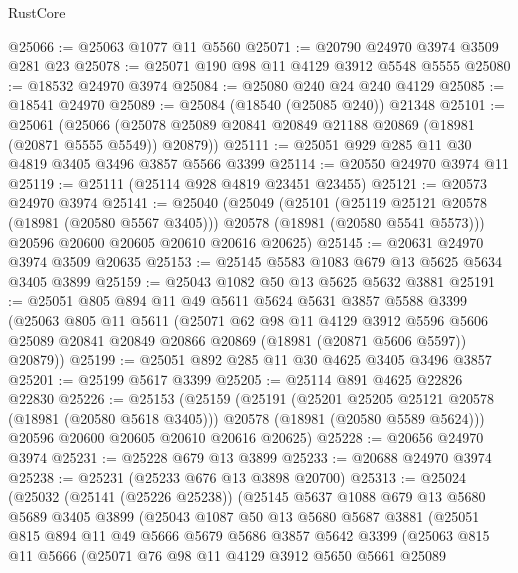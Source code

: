 \begin{lexlean}{RustCore}
\begin{coremodule}
@25066 := @25063 @1077 @11 @5560
@25071 := @20790 @24970 @3974 @3509 @281 @23
@25078 := @25071 @190 @98 @11 @4129 @3912 @5548 @5555
@25080 := @18532 @24970 @3974
@25084 := @25080 @240 @24 @240 @4129
@25085 := @18541 @24970
@25089 := @25084 (@18540 (@25085 @240)) @21348
@25101 := @25061
    (@25066 (@25078 @25089 @20841 @20849 @21188 @20869 (@18981 (@20871 @5555 @5549)) @20879))
@25111 := @25051 @929 @285 @11 @30 @4819 @3405 @3496 @3857 @5566 @3399
@25114 := @20550 @24970 @3974 @11
@25119 := @25111 (@25114 @928 @4819 @23451 @23455)
@25121 := @20573 @24970 @3974
@25141 := @25040
    (@25049
      (@25101
        (@25119 @25121 @20578 (@18981 (@20580 @5567 @3405)))
        @20578
        (@18981 (@20580 @5541 @5573)))
      @20596
      @20600
      @20605
      @20610
      @20616
      @20625)
@25145 := @20631 @24970 @3974 @3509 @20635
@25153 := @25145 @5583 @1083 @679 @13 @5625 @5634 @3405 @3899
@25159 := @25043 @1082 @50 @13 @5625 @5632 @3881
@25191 := @25051
    @805
    @894
    @11
    @49
    @5611
    @5624
    @5631
    @3857
    @5588
    @3399
    (@25063
      @805
      @11
      @5611
      (@25071
        @62
        @98
        @11
        @4129
        @3912
        @5596
        @5606
        @25089
        @20841
        @20849
        @20866
        @20869
        (@18981 (@20871 @5606 @5597))
        @20879))
@25199 := @25051 @892 @285 @11 @30 @4625 @3405 @3496 @3857
@25201 := @25199 @5617 @3399
@25205 := @25114 @891 @4625 @22826 @22830
@25226 := @25153
    (@25159
      (@25191
        (@25201 @25205 @25121 @20578 (@18981 (@20580 @5618 @3405)))
        @20578
        (@18981 (@20580 @5589 @5624)))
      @20596
      @20600
      @20605
      @20610
      @20616
      @20625)
@25228 := @20656 @24970 @3974
@25231 := @25228 @679 @13 @3899
@25233 := @20688 @24970 @3974
@25238 := @25231 (@25233 @676 @13 @3898 @20700)
@25313 := @25024
    (@25032
      (@25141 (@25226 @25238))
      (@25145
        @5637
        @1088
        @679
        @13
        @5680
        @5689
        @3405
        @3899
        (@25043
          @1087
          @50
          @13
          @5680
          @5687
          @3881
          (@25051
            @815
            @894
            @11
            @49
            @5666
            @5679
            @5686
            @3857
            @5642
            @3399
            (@25063
              @815
              @11
              @5666
              (@25071
                @76
                @98
                @11
                @4129
                @3912
                @5650
                @5661
                @25089

\end{coremodule}
\end{lexlean}
